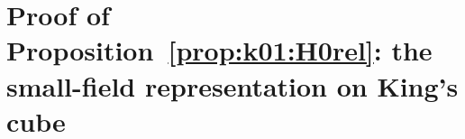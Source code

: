 \providecommand{\Hrel}{\ensuremath{(\mathrm{H0rel})_{C}}}
\providecommand{\Rzero}{\ensuremath{(\mathrm{R}_{0})}}
\providecommand{\BALint}{\ensuremath{(\mathrm{BAL}_{5})[\mathrm{int}]}}
\providecommand{\RENorb}{\ensuremath{(\mathrm{REN}_{\mathrm{orb}})}}
\providecommand{\Zk}{\ensuremath{Z_{k}}}
\providecommand{\Ik}[1]{\ensuremath{I^{(#1)}_{k}}}
\providecommand{\Xl}{\ensuremath{X_{\mathrm{live}}}}       %
\providecommand{\Kill}{\ensuremath{\mathsf K}}             %
\providecommand{\Wt}{\ensuremath{W}}                       %
\providecommand{\Mop}{\ensuremath{M}}                      %
\providecommand{\vth}{\ensuremath{\vartheta}}              %
\providecommand{\DD}{\ensuremath{\partial D}}              %
\providecommand{\dN}{\ensuremath{\partial_{N}}}            %
\providecommand{\dep}{\operatorname{depth}}
\providecommand{\Ebar}{\ensuremath{\mathsf E}}             %
\providecommand{\Lone}{\ensuremath{L_{1}}}                 %

\section{Proof of Proposition~\ref{prop:k01:H0rel}: the small-field representation on King's cube}\label{app:a01_H0rel}

